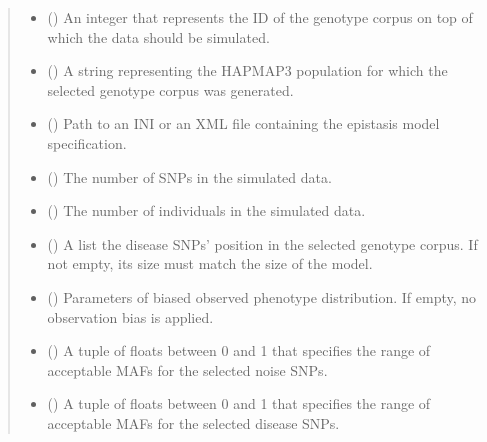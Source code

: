 \documentclass[a4paper,10pt,english]{sphinxhowto}
\begin{document}
\begin{fulllineitems}
\begin{fulllineitems}
\begin{quote}
\begin{description}
\begin{itemize}
\item {} 
 () \textendash{} An integer that represents the ID of the genotype corpus on top of which
the data should be simulated.

\item {} 
 () \textendash{} A string representing the HAPMAP3 population for which the selected genotype corpus was
generated.

\item {} 
 () \textendash{} Path to an INI or an XML file containing the epistasis model specification.

\item {} 
 () \textendash{} The number of SNPs in the simulated data.

\item {} 
 () \textendash{} The number of individuals in the simulated data.

\item {} 
 () \textendash{} A list the disease SNPs’ position in the selected genotype corpus. If not empty, its size must match the size of the model.

\item {} 
 () \textendash{} Parameters of biased observed phenotype distribution. If empty, no observation bias is applied.

\item {} 
 (\sphinxstyleliteralemphasis{\sphinxupquote{,}}) \textendash{} A tuple of floats between 0 and 1 that specifies the range of acceptable MAFs for the selected noise SNPs.

\item {} 
 (\sphinxstyleliteralemphasis{\sphinxupquote{,}}) \textendash{} A tuple of floats between 0 and 1 that specifies the range of acceptable MAFs for the selected disease SNPs.


\end{itemize}
\end{description}
\end{quote}
\end{fulllineitems}
\end{fulllineitems}
\end{document}
